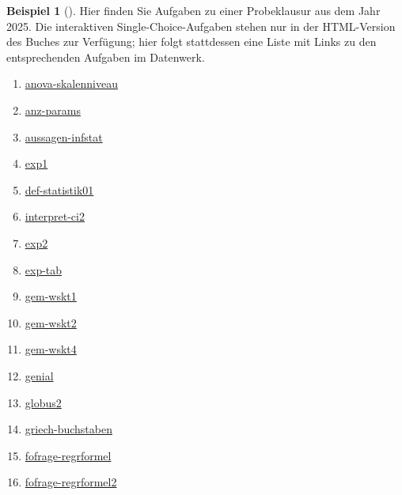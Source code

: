 \documentclass[
  ngerman,
  letterpaper,
  twoside,
  open=any]{scrbook}
\providecommand{\tightlist}{%
  \setlength{\itemsep}{0pt}\setlength{\parskip}{0pt}}\usepackage{longtable,booktabs,array}
\theoremstyle{definition}
\newtheorem{example}{Beispiel}[chapter]
\theoremstyle{plain}
\theoremstyle{definition}
\theoremstyle{definition}
\theoremstyle{remark}
\begin{document}
\begin{example}[]
Hier finden Sie Aufgaben zu einer Probeklausur aus dem Jahr 2025. Die
interaktiven Single-Choice-Aufgaben stehen nur in der HTML-Version des
Buches zur Verfügung; hier folgt stattdessen eine Liste mit Links zu den
entsprechenden Aufgaben im Datenwerk.

\begin{enumerate}
\def\labelenumi{\arabic{enumi}.}
\tightlist
\item
  \href{https://sebastiansauer.github.io/datenwerk/posts/anova-skalenniveau/anova-skalenniveau.html}{anova-skalenniveau}
\item
  \href{https://sebastiansauer.github.io/datenwerk/posts/anz-params/index.html}{anz-params}
\item
  \href{https://sebastiansauer.github.io/datenwerk/posts/aussagen-infstat/index.html}{aussagen-infstat}
\item
  \href{https://sebastiansauer.github.io/datenwerk/posts/exp1/index.html}{exp1}
\item
  \href{https://sebastiansauer.github.io/datenwerk/posts/def-statistik01/def-statistik01.html}{def-statistik01}
\item
  \href{https://sebastiansauer.github.io/datenwerk/posts/interpret-ci2/index.html}{interpret-ci2}
\item
  \href{https://sebastiansauer.github.io/datenwerk/posts/exp2/index.html}{exp2}
\item
  \href{https://sebastiansauer.github.io/datenwerk/posts/exp-tab/index.html}{exp-tab}
\item
  \href{https://sebastiansauer.github.io/datenwerk/posts/gem-wskt1/gem-wskt1.html}{gem-wskt1}
\item
  \href{https://sebastiansauer.github.io/datenwerk/posts/gem-wskt2/gem-wskt2.html}{gem-wskt2}
\item
  \href{https://sebastiansauer.github.io/datenwerk/posts/gem-wskt4/index.html}{gem-wskt4}
\item
  \href{https://sebastiansauer.github.io/datenwerk/posts/genial/index.html}{genial}
\item
  \href{https://sebastiansauer.github.io/datenwerk/posts/globus2/index.html}{globus2}
\item
  \href{https://sebastiansauer.github.io/datenwerk/posts/griech-buchstaben/griech-buchstaben.html}{griech-buchstaben}
\item
  \href{https://sebastiansauer.github.io/datenwerk/posts/fofrage-regrformel/index.html}{fofrage-regrformel}
\item
  \href{https://sebastiansauer.github.io/datenwerk/posts/fofrage-regrformel2/index.html}{fofrage-regrformel2}

\end{enumerate}
\end{example}
\end{document}
